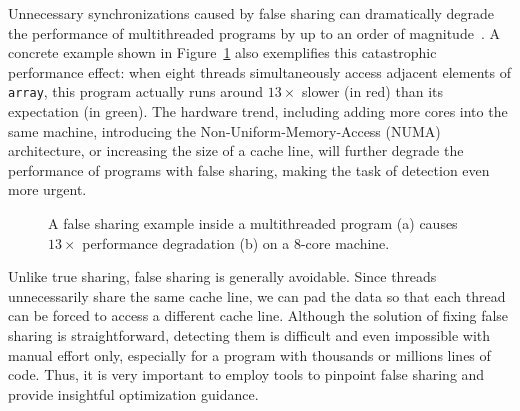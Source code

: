 Unnecessary synchronizations caused by false sharing can dramatically degrade the performance of multithreaded programs by up to an order of magnitude~\cite{falseshare:effect}. A concrete example shown in Figure~\ref{fig:penalty} also exemplifies this catastrophic performance effect: when eight threads simultaneously access adjacent elements of {\tt array}, this program actually runs around $13\times$ slower (in red) than its expectation (in green). The hardware trend, including adding more cores into the same machine, introducing the Non-Uniform-Memory-Access (NUMA) architecture, or increasing the size of a cache line, will further degrade the performance of programs with false sharing, making the task of detection even more urgent. 

\begin{figure}[htbp]
\centering
{}%
\hspace{30pt}
\caption{
A false sharing example inside a multithreaded program (a) causes $13\times$ performance degradation (b) on a 8-core machine.
\label{fig:penalty}}
\end{figure}

Unlike true sharing, false sharing is generally avoidable. Since threads unnecessarily share the same cache line, we can pad the data so that  each thread can be forced to access a different cache line. Although the solution of fixing false sharing is straightforward, detecting them is difficult and even impossible with manual effort only, especially for a program with  thousands or millions lines of code. Thus, it is very important to employ tools to pinpoint false sharing and provide insightful optimization guidance.

